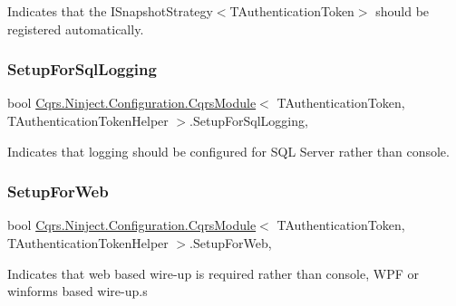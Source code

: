 Indicates that the I\+Snapshot\+Strategy$<$\+T\+Authentication\+Token$>$ should be registered automatically. 

\mbox{\label{classCqrs_1_1Ninject_1_1Configuration_1_1CqrsModule_a10e7a8adbe03fc05ebb7003727cbe541_a10e7a8adbe03fc05ebb7003727cbe541}} 
\subsubsection{\texorpdfstring{Setup\+For\+Sql\+Logging}{SetupForSqlLogging}}
{\footnotesize\ttfamily bool \hyperlink{classCqrs_1_1Ninject_1_1Configuration_1_1CqrsModule}{Cqrs.\+Ninject.\+Configuration.\+Cqrs\+Module}$<$ T\+Authentication\+Token, T\+Authentication\+Token\+Helper $>$.Setup\+For\+Sql\+Logging\hspace{0.3cm}{\ttfamily [get]}, {\ttfamily [protected]}}



Indicates that logging should be configured for S\+QL Server rather than console. 

\mbox{\label{classCqrs_1_1Ninject_1_1Configuration_1_1CqrsModule_ae4bbc2d44f283644a328d308dc78edc5_ae4bbc2d44f283644a328d308dc78edc5}} 
\subsubsection{\texorpdfstring{Setup\+For\+Web}{SetupForWeb}}
{\footnotesize\ttfamily bool \hyperlink{classCqrs_1_1Ninject_1_1Configuration_1_1CqrsModule}{Cqrs.\+Ninject.\+Configuration.\+Cqrs\+Module}$<$ T\+Authentication\+Token, T\+Authentication\+Token\+Helper $>$.Setup\+For\+Web\hspace{0.3cm}{\ttfamily [get]}, {\ttfamily [protected]}}



Indicates that web based wire-\/up is required rather than console, W\+PF or winforms based wire-\/up.\+s 

